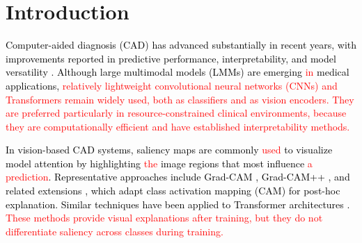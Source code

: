 \documentclass[preprint,7pt, a4paper]{elsarticle}
\begin{document}

\section{Introduction}
\textcolor{black}{Computer-aided diagnosis (CAD) has advanced substantially in recent years, with improvements reported in predictive performance, interpretability, and model versatility \cite{54,55,60,61,71}. Although large multimodal models (LMMs) \cite{69,70} are emerging \textcolor{red}{in} medical applications, \textcolor{red}{relatively lightweight convolutional neural networks (CNNs) and Transformers remain widely used, both as classifiers and as vision encoders. They are preferred particularly in resource-constrained clinical environments, because they are computationally efficient and have established interpretability methods.}}

\textcolor{black}{In vision-based CAD systems, saliency maps \cite{5,6,7} are commonly \textcolor{red}{used} to visualize model attention by highlighting \textcolor{red}{the} image regions that most influence \textcolor{red}{a prediction}. Representative approaches include Grad-CAM \cite{1}, Grad-CAM++ \cite{2}, and related extensions \cite{5,6,63}, which adapt class activation mapping (CAM) \cite{4} for post-hoc explanation. Similar techniques have been applied to Transformer architectures \cite{67,74,66}. \textcolor{red}{These methods provide visual explanations after training, but they do not differentiate saliency across classes during training.}}
\end{document}
